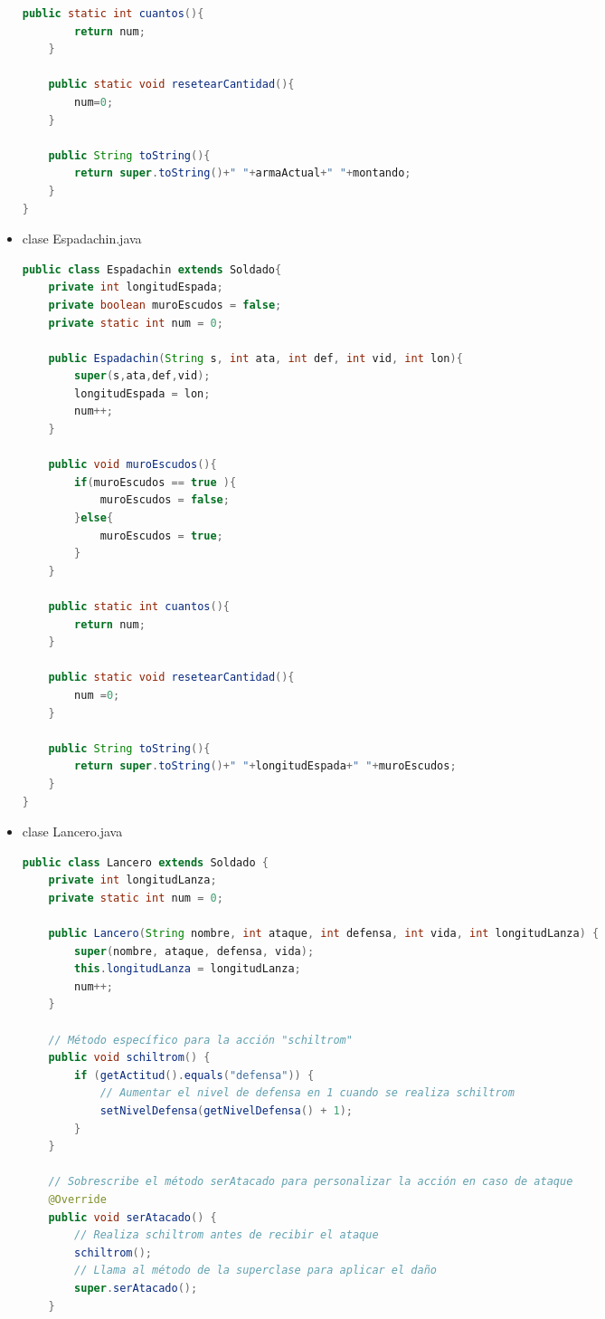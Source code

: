 \documentclass{article}
\begin{document}
\begin{itemize}
\begin{lstlisting}[language=java]
    public static int cuantos(){
        return num;
    }

    public static void resetearCantidad(){
        num=0;
    }

    public String toString(){
        return super.toString()+" "+armaActual+" "+montando;
    }
}

        \end{lstlisting}

        \item clase Espadachin.java
        \begin{lstlisting}[language=java]
public class Espadachin extends Soldado{
    private int longitudEspada;
    private boolean muroEscudos = false;
    private static int num = 0;

    public Espadachin(String s, int ata, int def, int vid, int lon){
        super(s,ata,def,vid);
        longitudEspada = lon;
        num++;
    }

    public void muroEscudos(){
        if(muroEscudos == true ){
            muroEscudos = false;
        }else{
            muroEscudos = true;
        }
    }

    public static int cuantos(){
        return num;
    }

    public static void resetearCantidad(){
        num =0;
    }

    public String toString(){
        return super.toString()+" "+longitudEspada+" "+muroEscudos;
    }
}
        \end{lstlisting}

        \item clase Lancero.java
        \begin{lstlisting}[language=java]
public class Lancero extends Soldado {
    private int longitudLanza;
    private static int num = 0;

    public Lancero(String nombre, int ataque, int defensa, int vida, int longitudLanza) {
        super(nombre, ataque, defensa, vida);
        this.longitudLanza = longitudLanza;
        num++;
    }

    // Método específico para la acción "schiltrom"
    public void schiltrom() {
        if (getActitud().equals("defensa")) {
            // Aumentar el nivel de defensa en 1 cuando se realiza schiltrom
            setNivelDefensa(getNivelDefensa() + 1);
        }
    }

    // Sobrescribe el método serAtacado para personalizar la acción en caso de ataque
    @Override
    public void serAtacado() {
        // Realiza schiltrom antes de recibir el ataque
        schiltrom();
        // Llama al método de la superclase para aplicar el daño
        super.serAtacado();
    }


\end{lstlisting}
\end{itemize}
\end{document}
